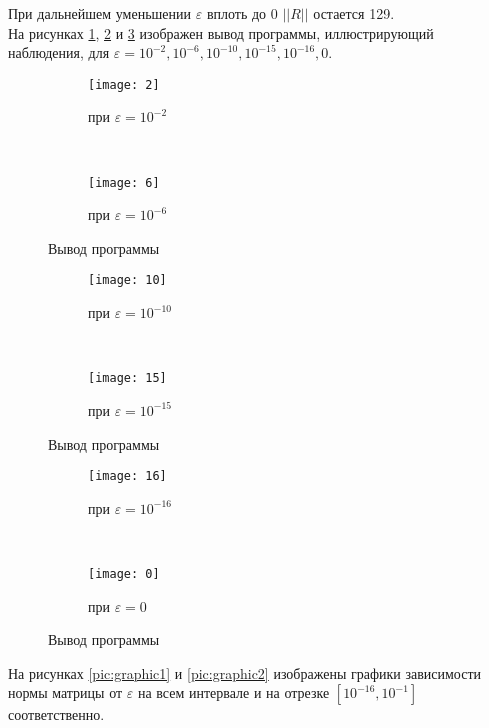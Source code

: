 При дальнейшем уменьшении $\varepsilon$ вплоть до 0 $||R||$ остается 129.\\[3mm]
   
   На рисунках \ref{pic:demo1}, \ref{pic:demo2} и \ref{pic:demo3} изображен вывод программы, иллюстрирующий наблюдения, для $\varepsilon = 10^{-2}, 10^{-6}, 10^{-10}, 10^{-15}, 10^{-16}, 0$.

\begin{figure}[H]
    \centering
    \begin{subfigure}[t]{0.5\textwidth}
        \centering
        \texttt{[image: 2]}
        \caption{при $\varepsilon = 10^{-2}$}
    \end{subfigure}%
    ~ 
    \begin{subfigure}[t]{0.5\textwidth}
        \centering
        \texttt{[image: 6]}
        \caption{при $\varepsilon = 10^{-6}$}
    \end{subfigure}
    \caption{Вывод программы}
    \label{pic:demo1}
\end{figure}

\begin{figure}[H]
    \centering
    \begin{subfigure}[t]{0.5\textwidth}
        \centering
        \texttt{[image: 10]}
        \caption{при $\varepsilon = 10^{-10}$}
    \end{subfigure}%
    ~ 
    \begin{subfigure}[t]{0.5\textwidth}
        \centering
        \texttt{[image: 15]}
        \caption{при $\varepsilon = 10^{-15}$}
    \end{subfigure}
    \caption{Вывод программы}
    \label{pic:demo2}
\end{figure}

\begin{figure}[H]
    \centering
    \begin{subfigure}[t]{0.5\textwidth}
        \centering
        \texttt{[image: 16]}
        \caption{при $\varepsilon = 10^{-16}$}
    \end{subfigure}%
    ~ 
    \begin{subfigure}[t]{0.5\textwidth}
        \centering
        \texttt{[image: 0]}
        \caption{при $\varepsilon = 0$}
    \end{subfigure}
    \caption{Вывод программы}
    \label{pic:demo3}
\end{figure} 

На рисунках \ref{pic:graphic1} и \ref{pic:graphic2} изображены графики зависимости нормы матрицы от $\varepsilon$ на всем интервале и на отрезке $[10^{-16}, 10^{-1}]$ соответственно.

